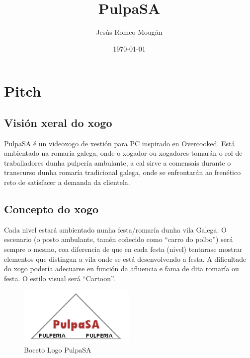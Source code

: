 \documentclass{report}  %
\title{PulpaSA}  %
\author{Jesús Romeo Mougán}                     %
\date{\today}                           %
\begin{document}
\captionsetup{aboveskip=5pt, belowskip=10pt}



\renewcommand{\contentsname}{Índice}

\tableofcontents


\newpage

\section{Pitch}

\subsection{Visión xeral do xogo}
PulpaSA é un videoxogo de xestión para PC inspirado en Overcooked. Está 
ambientado na romaría galega, onde o xogador ou xogadores tomarán o rol de 
traballadores dunha pulpería ambulante, a cal sirve a comensais durante o 
transcurso dunha romaría tradicional galega, onde se enfrontarán ao frenético 
reto de satisfacer a demanda da clientela.

\subsection{Concepto do xogo}

Cada nivel estará ambientado nunha festa/romaría dunha vila Galega. O 
escenario (o posto ambulante, tamén coñecido como “carro do polbo”) será 
sempre o mesmo, coa diferencia de que en cada festa (nivel) tentarase 
mostrar elementos que distingan a vila onde se está desenvolvendo a festa. A 
dificultade do xogo podería adecuarse en función da afluencia e fama de dita 
romaría ou festa. O estilo visual será “Cartoon”.

\begin{figure}[h]
    \centering
    \includegraphics[width=0.5\textwidth]{images/pulpasa_logo.png}
    \caption{Boceto Logo PulpaSA}
    \label{fig:Boceto Logo PulpaSA}
\end{figure}
\end{document}
